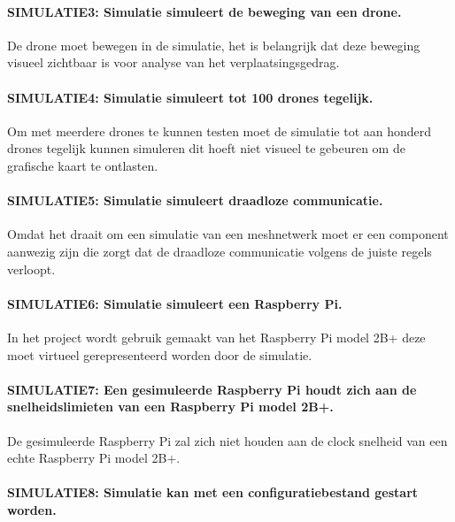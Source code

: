 \documentclass[a4paper, 11pt, oneside]{report}
\begin{document}
\paragraph{SIMULATIE3: Simulatie simuleert de beweging van een drone.}
\hypertarget{SIMULATIE3}{}

De drone moet bewegen in de simulatie, het is belangrijk dat deze beweging visueel zichtbaar is voor analyse van het verplaatsingsgedrag.

\paragraph{SIMULATIE4: Simulatie simuleert tot 100 drones tegelijk.}
\hypertarget{SIMULATIE4}{}

Om met meerdere drones te kunnen testen moet de simulatie tot aan honderd drones tegelijk kunnen simuleren dit hoeft niet visueel te gebeuren om de grafische kaart te ontlasten.

\paragraph{SIMULATIE5: Simulatie simuleert draadloze communicatie.}
\hypertarget{SIMULATIE5}{}

Omdat het draait om een simulatie van een meshnetwerk moet er een component aanwezig zijn die zorgt dat de draadloze communicatie volgens de juiste regels verloopt.

\paragraph{SIMULATIE6: Simulatie simuleert een Raspberry Pi.}
\hypertarget{SIMULATIE6}{}

In het project wordt gebruik gemaakt van het Raspberry Pi model 2B+ deze moet virtueel gerepresenteerd worden door de simulatie.

\paragraph{SIMULATIE7: Een gesimuleerde Raspberry Pi houdt zich aan de snelheidslimieten van een Raspberry Pi model 2B+.}
\hypertarget{SIMULATIE7}{}

De gesimuleerde Raspberry Pi zal zich niet houden aan de clock snelheid van een echte Raspberry Pi model 2B+.

\paragraph{SIMULATIE8: Simulatie kan met een configuratiebestand gestart worden.}
\hypertarget{SIMULATIE8}{}
\end{document}
